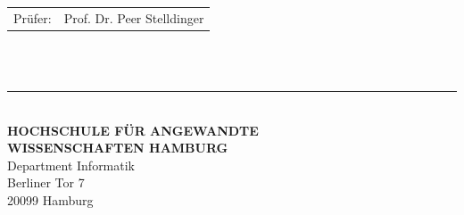 \begin{titlepage}
  \vspace{5cm}

  \hspace*{37mm}
  \begin{minipage}{0.5\linewidth}
    \begin{tabular}{@{}ll}
      Prüfer: & Prof. Dr. Peer Stelldinger\\[-.3mm]
    \end{tabular}\\

    \,\rule{9mm}{1mm}\\[1.5mm]

    \textbf{HOCHSCHULE FÜR ANGEWANDTE}\\
    \textbf{WISSENSCHAFTEN HAMBURG}\\
    Department Informatik\\
    Berliner Tor 7\\
    20099 Hamburg
  \end{minipage}
\end{titlepage}
\restoregeometry

\thispagestyle{empty}